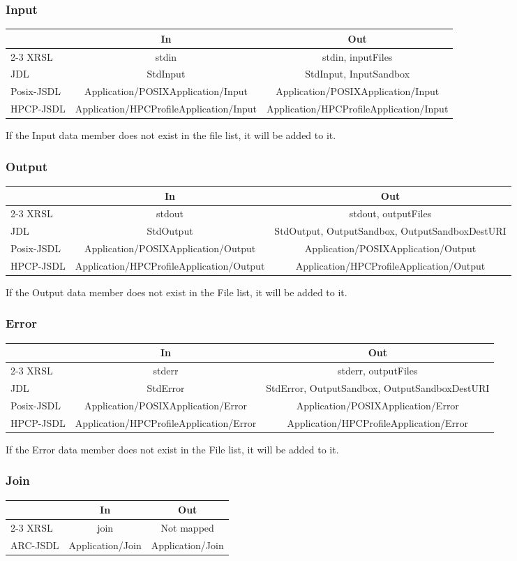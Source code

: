 \documentclass{article}
\newcommand{\NM}{\normalsize{\textnormal{Not mapped}}}
\newenvironment{inouttabular}%
{\begin{center}\begin{tabular}{l>{\ttfamily\footnotesize}c>{\ttfamily\footnotesize}c}%
\toprule
& \textnormal{\normalsize{In}} & \textnormal{\normalsize{Out}}\\ \cmidrule{2-3}}
{\bottomrule\end{tabular}\end{center}}
\begin{document}
\subsubsection{Input}
\begin{inouttabular}
XRSL & stdin & stdin, inputFiles\\
JDL & StdInput & StdInput, InputSandbox\\
Posix-JSDL & Application/POSIXApplication/Input & Application/POSIXApplication/Input\\
HPCP-JSDL & Application/HPCProfileApplication/Input & Application/HPCProfileApplication/Input\\
\end{inouttabular}
If the Input data member does not exist in the file list, it will be
added to it.

\subsubsection{Output}
\begin{inouttabular}
XRSL & stdout & stdout, outputFiles\\
JDL & StdOutput & StdOutput, OutputSandbox, OutputSandboxDestURI\\
Posix-JSDL & Application/POSIXApplication/Output & Application/POSIXApplication/Output\\
HPCP-JSDL & Application/HPCProfileApplication/Output & Application/HPCProfileApplication/Output\\
\end{inouttabular}
If the Output data member does not exist in the File
list, it will be added to it.

\subsubsection{Error}
\begin{inouttabular}
XRSL & stderr & stderr, outputFiles\\
JDL & StdError & StdError, OutputSandbox, OutputSandboxDestURI\\
Posix-JSDL & Application/POSIXApplication/Error & Application/POSIXApplication/Error\\
HPCP-JSDL & Application/HPCProfileApplication/Error & Application/HPCProfileApplication/Error\\
\end{inouttabular}
If the Error data member does not exist in the File list, it will be
added to it.

\subsubsection{Join}
\begin{inouttabular}
XRSL & join & \NM\\
ARC-JSDL & Application/Join & Application/Join\\
\end{inouttabular}
\end{document}
